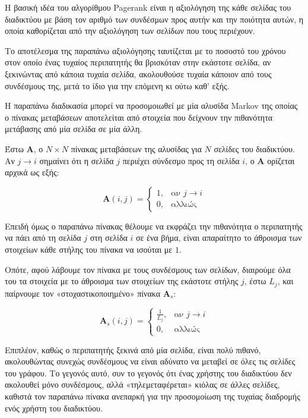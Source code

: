 Η βασική ιδέα του αλγορίθμου Pagerank είναι η αξιολόγηση της κάθε σελίδας του διαδικτύου με βάση τον αριθμό των συνδέσμων προς αυτήν και την ποιότητα αυτών, η οποία καθορίζεται από την αξιολόγηση των σελίδων που τους περιέχουν.

Το αποτέλεσμα της παραπάνω αξιολόγησης ταυτίζεται με το ποσοστό του χρόνου στον οποίο ένας τυχαίος περιπατητής θα βρισκόταν στην εκάστοτε σελίδα, αν ξεκινώντας από κάποια τυχαία σελίδα, ακολουθούσε τυχαία κάποιον από τους συνδέσμους της, μετά το ίδιο για την επόμενη κι ούτω καθ' εξής.

Η παραπάνω διαδικασία μπορεί να προσομοιωθεί με μία αλυσίδα Markov της οποίας ο πίνακας μεταβάσεων αποτελείται από στοιχεία που δείχνουν την πιθανότητα μετάβασης από μία σελίδα σε μία άλλη.

Έστω $\bm{A}$, ο $N\times N$  πίνακας μεταβάσεων της αλυσίδας για $N$ σελίδες του διαδικτύου. Αν  $ j\rightarrow i$ σημαίνει ότι η σελίδα $j$ περιέχει σύνδεσμο προς τη σελίδα $i$, ο $\bm{A}$ ορίζεται αρχικά ως εξής:

\[
  \bm{A}(i, j) = 
  \begin{cases}
    1, & \text{αν } j\rightarrow i \\
    0, & \text{αλλιώς }
  \end{cases}
\]

Επειδή όμως ο παραπάνω πίνακας θέλουμε να εκφράζει την πιθανότητα ο περιπατητής να πάει από τη σελίδα $j$ στη σελίδα $i$ σε ένα βήμα, είναι απαραίτητο το άθροισμα των στοιχείων κάθε στήλης του πίνακα να ισούται με $1$.

Οπότε, αφού λάβουμε τον πίνακα με τους συνδέσμους των σελίδων, διαιρούμε όλα του τα στοιχεία με το άθροισμα των στοιχείων της εκάστοτε στήλης $j$, έστω $L_j$, και παίρνουμε τον «στοχαστικοποιημένο» πίνακα $\bm{A}_s$:

\[
  \bm{A}_s(i, j) = 
  \begin{cases}
    \frac{1}{L_j}, & \text{αν } j\rightarrow i \\
    0, & \text{αλλιώς }
  \end{cases}
\]

Επιπλέον, καθώς ο περιπατητής ξεκινά από μία σελίδα, είναι πολύ πιθανό, ακολουθώντας συνεχώς συνδέσμους να είναι αδύνατο να μεταβεί σε όλες τις σελίδες του γράφου. Το γεγονός αυτό, συν το γεγονός ότι ένας χρήστης του διαδικτύου δεν ακολουθεί μόνο συνδέσμους, αλλά «τηλεμεταφέρεται» κιόλας σε άλλες σελίδες, καθιστά τον παραπάνω πίνακα ανεπαρκή για την προσομοίωση της τυχαίας διαδρομής ενός χρήστη του διαδικτύου.

